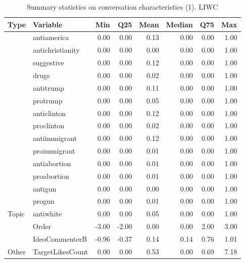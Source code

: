 \begin{table}[!h]
\centering
\caption{\label{tab:summ-tab-topics}Summary statistics on conversation characteristics (1). LIWC}
\centering
\begin{tabular}[t]{llrrrrrr}
\toprule
Type & Variable & Min & Q25 & Mean & Median & Q75 & Max\\
\midrule
 & antiamerica & 0.00 & 0.00 & 0.13 & 0.00 & 0.00 & 1.00\\
\cmidrule{2-8}
 & antichristianity & 0.00 & 0.00 & 0.00 & 0.00 & 0.00 & 1.00\\
\cmidrule{2-8}
 & suggestive & 0.00 & 0.00 & 0.12 & 0.00 & 0.00 & 1.00\\
\cmidrule{2-8}
 & drugs & 0.00 & 0.00 & 0.02 & 0.00 & 0.00 & 1.00\\
\cmidrule{2-8}
 & antitrump & 0.00 & 0.00 & 0.11 & 0.00 & 0.00 & 1.00\\
\cmidrule{2-8}
 & protrump & 0.00 & 0.00 & 0.05 & 0.00 & 0.00 & 1.00\\
\cmidrule{2-8}
 & anticlinton & 0.00 & 0.00 & 0.12 & 0.00 & 0.00 & 1.00\\
\cmidrule{2-8}
 & proclinton & 0.00 & 0.00 & 0.02 & 0.00 & 0.00 & 1.00\\
\cmidrule{2-8}
 & antiimmigrant & 0.00 & 0.00 & 0.12 & 0.00 & 0.00 & 1.00\\
\cmidrule{2-8}
 & proimmigrant & 0.00 & 0.00 & 0.01 & 0.00 & 0.00 & 1.00\\
\cmidrule{2-8}
 & antiabortion & 0.00 & 0.00 & 0.01 & 0.00 & 0.00 & 1.00\\
\cmidrule{2-8}
 & proabortion & 0.00 & 0.00 & 0.01 & 0.00 & 0.00 & 1.00\\
\cmidrule{2-8}
 & antigun & 0.00 & 0.00 & 0.00 & 0.00 & 0.00 & 1.00\\
\cmidrule{2-8}
 & progun & 0.00 & 0.00 & 0.01 & 0.00 & 0.00 & 1.00\\
\cmidrule{2-8}
\multirow{-15}{*}{\raggedright\arraybackslash Topic} & antiwhite & 0.00 & 0.00 & 0.05 & 0.00 & 0.00 & 1.00\\
\cmidrule{1-8}
 & Order & -3.00 & -2.00 & 0.00 & 0.00 & 2.00 & 3.00\\
\cmidrule{2-8}
 & IdeoCommenterB & -0.96 & -0.37 & 0.14 & 0.14 & 0.76 & 1.01\\
\cmidrule{2-8}
\multirow{-3}{*}{\raggedright\arraybackslash Other} & TargetLikesCount & 0.00 & 0.00 & 0.53 & 0.00 & 0.69 & 7.18\\
\bottomrule
\end{tabular}
\end{table}
